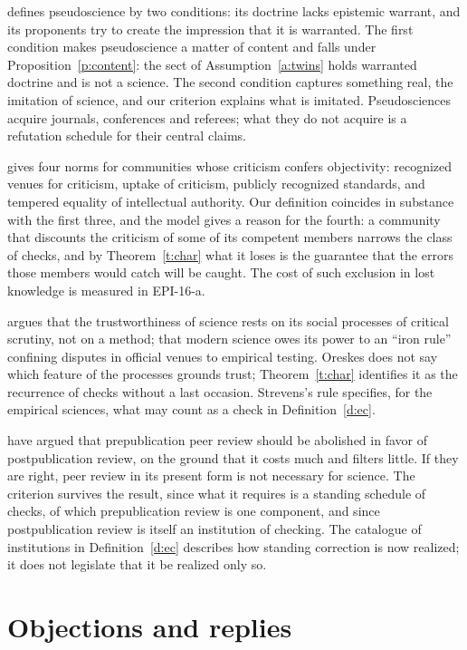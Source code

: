 \documentclass{situationist-preprint}
\begin{document}
\citet{Hansson2013} defines pseudoscience by two conditions: its doctrine lacks epistemic warrant, and its proponents try to create the impression that it is warranted. The first condition makes pseudoscience a matter of content and falls under Proposition~\ref{p:content}: the sect of Assumption~\ref{a:twins} holds warranted doctrine and is not a science. The second condition captures something real, the imitation of science, and our criterion explains what is imitated. Pseudosciences acquire journals, conferences and referees; what they do not acquire is a refutation schedule for their central claims.

\citet{Longino1990,Longino2002} gives four norms for communities whose criticism confers objectivity: recognized venues for criticism, uptake of criticism, publicly recognized standards, and tempered equality of intellectual authority. Our definition coincides in substance with the first three, and the model gives a reason for the fourth: a community that discounts the criticism of some of its competent members narrows the class of checks, and by Theorem~\ref{t:char} what it loses is the guarantee that the errors those members would catch will be caught. The cost of such exclusion in lost knowledge is measured in EPI-16-a.

\citet{Oreskes2019} argues that the trustworthiness of science rests on its social processes of critical scrutiny, not on a method; \citet{Strevens2020} that modern science owes its power to an \enquote{iron rule} confining disputes in official venues to empirical testing. Oreskes does not say which feature of the processes grounds trust; Theorem~\ref{t:char} identifies it as the recurrence of checks without a last occasion. Strevens's rule specifies, for the empirical sciences, what may count as a check in Definition~\ref{d:ec}.

\citet{HeesenBright2021} have argued that prepublication peer review should be abolished in favor of postpublication review, on the ground that it costs much and filters little. If they are right, peer review in its present form is not necessary for science. The criterion survives the result, since what it requires is a standing schedule of checks, of which prepublication review is one component, and since postpublication review is itself an institution of checking. The catalogue of institutions in Definition~\ref{d:ec} describes how standing correction is now realized; it does not legislate that it be realized only so.

\section{Objections and replies}\label{s:objections}
\end{document}
